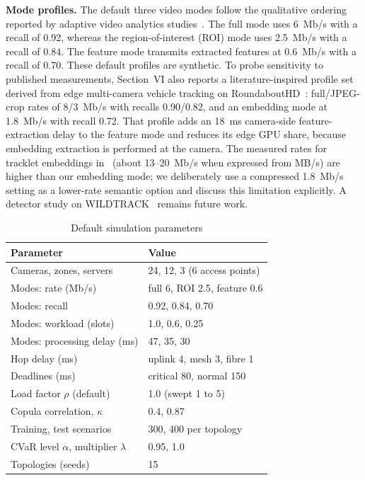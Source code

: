 \documentclass[letterpaper,journal]{IEEEtran}
\begin{document}
\textbf{Mode profiles.} The default three video modes follow the qualitative ordering reported by adaptive video analytics studies~\cite{jiang2018chameleon,zhang2018awstream,li2020reducto}. The full mode uses 6~Mb/s with a recall of 0.92, whereas the region-of-interest (ROI) mode uses 2.5~Mb/s with a recall of 0.84. The feature mode transmits extracted features at 0.6~Mb/s with a recall of 0.70. These default profiles are synthetic. To probe sensitivity to published measurements, Section~VI also reports a literature-inspired profile set derived from edge multi-camera vehicle tracking on RoundaboutHD~\cite{lin2025easemcvt}: full/JPEG-crop rates of 8/3~Mb/s with recalls 0.90/0.82, and an embedding mode at 1.8~Mb/s with recall 0.72. That profile adds an 18~ms camera-side feature-extraction delay to the feature mode and reduces its edge GPU share, because embedding extraction is performed at the camera. The measured rates for tracklet embeddings in~\cite{lin2025easemcvt} (about 13--20~Mb/s when expressed from MB/s) are higher than our embedding mode; we deliberately use a compressed 1.8~Mb/s setting as a lower-rate semantic option and discuss this limitation explicitly. A detector study on WILDTRACK~\cite{chavdarova2018wildtrack} remains future work.

\begin{table}[t]
\caption{Default simulation parameters}
\label{tab:params}
\centering\footnotesize
\begin{tabular}{@{}p{}p{}@{}}
\toprule
Parameter & Value \\ \midrule
Cameras, zones, servers & 24, 12, 3 (6 access points) \\
Modes: rate (Mb/s) & full 6, ROI 2.5, feature 0.6 \\
Modes: recall & 0.92, 0.84, 0.70 \\
Modes: workload (slots) & 1.0, 0.6, 0.25 \\
Modes: processing delay (ms) & 47, 35, 30 \\
Hop delay (ms) & uplink 4, mesh 3, fibre 1 \\
Deadlines (ms) & critical 80, normal 150 \\
Load factor $\rho$ (default) & 1.0 (swept 1 to 5) \\
Copula correlation, $\kappa$ & 0.4, 0.87 \\
Training, test scenarios & 300, 400 per topology \\
CVaR level $\alpha$, multiplier $\lambda$ & 0.95, 1.0 \\
Topologies (seeds) & 15 \\
\bottomrule
\end{tabular}
\end{table}
\end{document}
